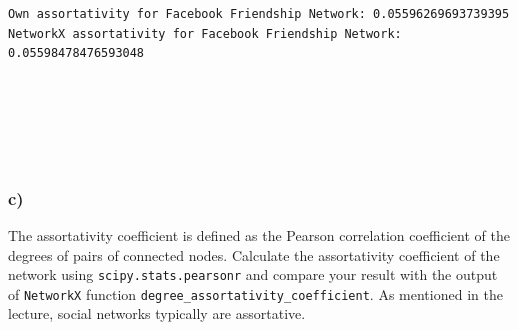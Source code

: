 \documentclass[11pt]{article}
\begin{document}
    \begin{center}
    \end{center}
    { \hspace*{\fill} \\}
    
    \begin{center}
    \end{center}
    { \hspace*{\fill} \\}
    
    \begin{Verbatim}[commandchars=\\\{\}]
Own assortativity for Facebook Friendship Network: 0.05596269693739395
NetworkX assortativity for Facebook Friendship Network: 0.05598478476593048

    \end{Verbatim}

    \begin{center}
    \end{center}
    { \hspace*{\fill} \\}
    
    \begin{center}
    \end{center}
    { \hspace*{\fill} \\}
    
    \begin{center}
    \end{center}
    { \hspace*{\fill} \\}
    
    \subsubsection{c)}\label{c}

The assortativity coefficient is defined as the Pearson correlation
coefficient of the degrees of pairs of connected nodes. Calculate the
assortativity coefficient of the network using
\texttt{scipy.stats.pearsonr} and compare your result with the output of
\texttt{NetworkX} function \texttt{degree\_assortativity\_coefficient}.
As mentioned in the lecture, social networks typically are assortative.
\end{document}
